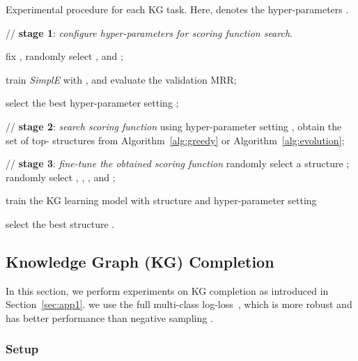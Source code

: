 \documentclass[10pt,journal,compsoc]{IEEEtran}
\begin{document}
\begin{algorithm}[ht]
	\caption{Experimental procedure for each KG task.
Here,  denotes
the hyper-parameters 
.}
	\label{alg:full}
	\small
	\begin{algorithmic}[1]
		\STATE // \textbf{stage 1}: \textit{configure hyper-parameters for scoring function search}.
			
		\FOR{} \label{step:before-for}
		\STATE fix , randomly select ,  and ;
		
		\STATE train \textit{SimplE} with , and evaluate the validation MRR; 
		\label{step:before-run}
		
\ENDFOR


		\STATE  
		select the best hyper-parameter setting ; \label{step:before-best} 
	 
		\STATE // \textbf{stage 2}: \textit{search scoring function} 
		\STATE 
		using hyper-parameter setting ,
		obtain the set  of top- structures from Algorithm~\ref{alg:greedy} or Algorithm~\ref{alg:evolution};
		\label{step:search}
		
		\STATE
		// \textbf{stage 3}: \textit{fine-tune the obtained scoring function}
		\label{step:after}
			\STATE randomly select a structure ;
			\STATE randomly select , , 
			,
			and ;
			
			\STATE train the KG learning model with 
			structure  and hyper-parameter setting 
			
			
		\ENDFOR \label{step:after-endfor}
		
		\STATE 
select the best structure . 
		 
\end{algorithmic}
\end{algorithm}


\subsection{Knowledge Graph (KG) Completion}
\label{ssec:KGC}

In this section, we perform experiments 
on KG completion as introduced in Section~\ref{sec:app1}.  
we use the full multi-class log-loss~\cite{lacroix2018canonical},
which is more robust and
has better performance than negative sampling \cite{lacroix2018canonical,zhang2020autosf}.

\subsubsection{Setup}
\label{sssec:kgcsetup}
\end{document}
